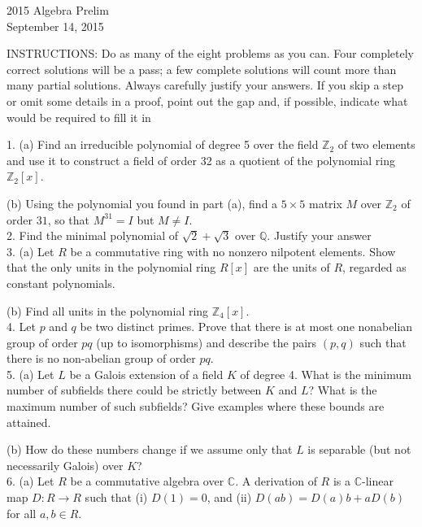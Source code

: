 \documentclass[11pt]{article}
\newcommand{\Z}{\mathbb{Z}}
\newcommand{\Q}{\mathbb{Q}}
\newcommand{\C}{\mathbb{C}}
\begin{document}
\begin{center}
\Large 2015 Algebra Prelim\\
\normalsize September 14, 2015
\end{center}
\vspace{1em}

INSTRUCTIONS: Do as many of the eight problems as you can. Four completely
correct solutions will be a pass; a few complete solutions will count more than many
partial solutions. Always carefully justify your answers. If you skip a step or omit
some details in a proof, point out the gap and, if possible, indicate what would be
required to fill it in\\
\vspace{1em}


1. (a) Find an irreducible polynomial of degree 5 over the field $\Z_2$ of two elements
and use it to construct a field of order 32 as a quotient of the polynomial ring $\Z_2[x]$.

(b) Using the polynomial you found in part (a), find a $5\times 5$ matrix $M$ over $\Z_2$
of order $31$, so that $M^{31} = I$ but $M \neq I$.\\

2. Find the minimal polynomial of $\sqrt{2}+\sqrt{3}$ over $\Q$. Justify your answer\\

3. (a) Let $R$ be a commutative ring with no nonzero nilpotent elements. Show
that the only units in the polynomial ring $R[x]$ are the units of $R$, regarded as
constant polynomials.

(b) Find all units in the polynomial ring $\Z_4[x]$.\\

4. Let $p$ and $q$ be two distinct primes. Prove that there is at most one nonabelian
group of order $pq$ (up to isomorphisms) and describe the pairs $(p, q)$ such
that there is no non-abelian group of order $pq$.\\

5. (a) Let $L$ be a Galois extension of a field $K$ of degree 4. What is the minimum
number of subfields there could be strictly between $K$ and $L$? What is the maximum
number of such subfields? Give examples where these bounds are attained.

(b) How do these numbers change if we assume only that $L$ is separable (but not
necessarily Galois) over $K$?\\

6. (a) Let $R$ be a commutative algebra over $\C$. A derivation of $R$ is a $\C$-linear map $D:R\to R$ such that (i) $D(1) = 0$, and (ii) $D(ab) = D(a)b + aD(b)$ for all $a,b\in R$.
\end{document}
